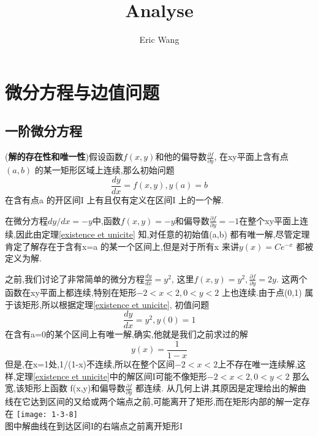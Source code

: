\documentclass{book}
\begin{document}
\title{Analyse}
\author{Eric Wang}

\maketitle
\tableofcontents

\chapter{微分方程与边值问题}
\section{一阶微分方程}
\begin{theorem}
  ({\bf 解的存在性和唯一性})假设函数$f(x,y)$和他的偏导数$\frac{\partial f}{\partial y}$, 在xy平面上含有点$(a,b)$ 的某一矩形区域上连续,那么初始问题
  \begin{equation}
    \frac{dy}{dx}=f(x,y),y(a)=b
  \end{equation}
  在含有点a 的开区间I 上有且仅有定义在区间I 上的一个解.
  \label{existence et unicite}
\end{theorem}
\begin{example}
  在微分方程$dy/dx=-y$中,函数$f(x,y)=-y$和偏导数$\frac{\partial f}{\partial y}=-1$在整个xy平面上连续,因此由定理\ref{existence et unicite} 知,对任意的初始值(a,b) 都有唯一解,尽管定理肯定了解存在于含有x=a 的某一个区间上,但是对于所有x 来讲$y(x)=Ce^{-x}$ 都被定义为解.
\end{example}
\begin{note}
  之前,我们讨论了非常简单的微分方程$\frac{dy}{dx}=y^2$, 这里$f(x,y)=y^2,\frac{\partial f}{\partial y}=2y$. 这两个函数在xy平面上都连续,特别在矩形$-2<x<2,0<y<2 $ 上也连续.由于点(0,1) 属于该矩形,所以根据定理\ref{existence et unicite}, 初值问题
  \begin{equation}
    \frac{dy}{dx}=y^2,y(0)=1
  \end{equation}
  在含有a=0的某个区间上有唯一解,确实,他就是我们之前求过的解$$y(x)=\frac{1}{1-x}$$
  但是,在x=1处,1/(1-x)不连续,所以在整个区间$-2<x<2 $上不存在唯一连续解,这样,定理\ref{existence et unicite}中的解区间I可能不像矩形$-2<x<2,0<y<2$ 那么宽,该矩形上函数 f(x,y)和偏导数$\frac{\partial f}{\partial y}$ 都连续. 从几何上讲,其原因是定理给出的解曲线在它达到区间的又给或两个端点之前,可能离开了矩形,而在矩形内部的解一定存在 \newline
\texttt{[image: 1-3-8]}\\
图中解曲线在到达区间I的右端点之前离开矩形I
\end{note}
\end{document}
